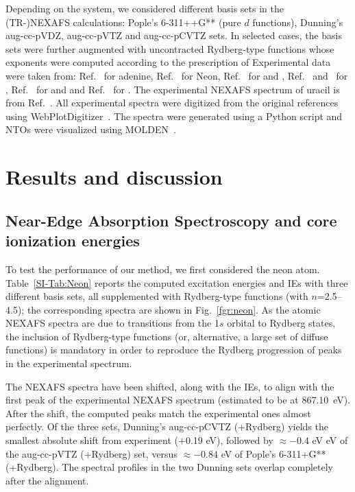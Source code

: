 \documentclass[journal=jctcce,manuscript=article]{achemso}
\begin{document}
Depending on the system, we considered different basis sets  in the (TR-)NEXAFS calculations:  Pople's 6-311++G** (pure $d$ functions), Dunning's aug-cc-pVDZ, aug-cc-pVTZ and aug-cc-pCVTZ sets. In selected cases, the basis sets were further augmented with uncontracted Rydberg-type functions whose exponents were computed according to the prescription of \citeauthor{Rydberg_basis}\cite{Rydberg_basis} 
Experimental data were taken from:  Ref.~
for adenine, Ref.~ for Neon,
Ref.~ for  and ,
Ref.~ and~ for ,
Ref.~ for  and  and Ref.~ for .
The experimental NEXAFS spectrum of uracil is from Ref.~.
All experimental spectra were digitized from the 
original references using WebPlotDigitizer~\cite{WPD}. 
The spectra were generated using a Python script and NTOs were visualized using MOLDEN~\cite{molden}.

\section{Results and discussion}
\subsection{Near-Edge Absorption Spectroscopy and core ionization energies}

To test the performance of our method, we first considered the neon atom.  Table~\ref{SI-Tab:Neon} reports the computed excitation energies and IEs with three different basis sets, all supplemented with Rydberg-type functions (with $n$=2.5--4.5); the corresponding spectra are shown in Fig.~\ref{fgr:neon}. 
As the atomic NEXAFS spectra are due to transitions from the 1$s$ orbital to Rydberg states, the inclusion of Rydberg-type functions (or, alternative, a large set of diffuse functions) is mandatory in order to reproduce the Rydberg progression of peaks in the experimental spectrum.~\cite{coriani2012pra}

The NEXAFS spectra have been shifted, along with the IEs, to align with the first peak of the experimental NEXAFS spectrum (estimated to be at 867.10~eV). After the shift, the computed peaks match the  experimental ones almost perfectly. Of the three sets, Dunning's aug-cc-pCVTZ (+Rydberg) yields the smallest absolute shift from experiment (+0.19 eV), followed by $\approx -0.4$ eV eV of the aug-cc-pVTZ (+Rydberg) set, versus $\approx -0.84$ eV of Pople's  6-311+G**(+Rydberg). The spectral profiles in the two Dunning sets overlap completely after the alignment. 
\end{document}
